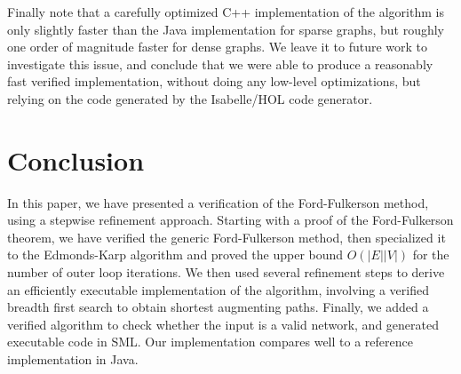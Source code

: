\documentclass{llncs}
\begin{document}
  Finally note that a carefully optimized C++ implementation of the algorithm is only slightly faster than the Java implementation for sparse graphs,
  but roughly one order of magnitude faster for dense graphs. We leave it to future work to investigate this issue, and conclude that we were able to produce
  a reasonably fast verified implementation, without doing any low-level optimizations, but relying on the code generated by the Isabelle/HOL code generator.
  
% 
% 
    
    

\section{Conclusion}
  In this paper, we have presented a verification of the Ford-Fulkerson method, using a stepwise refinement approach.
  Starting with a proof of the Ford-Fulkerson theorem, we have verified the generic Ford-Fulkerson method, then 
  specialized it to the Edmonds-Karp algorithm and proved the upper bound $O(|E||V|)$ for the number of outer loop iterations.
  We then used several refinement steps to derive an efficiently executable implementation of the algorithm, 
  involving a verified breadth first search to obtain shortest augmenting paths. 
  Finally, we added a verified algorithm to check whether the input is a valid network, and generated executable code in SML.
  Our implementation compares well to a reference implementation in Java.
  
\end{document}

